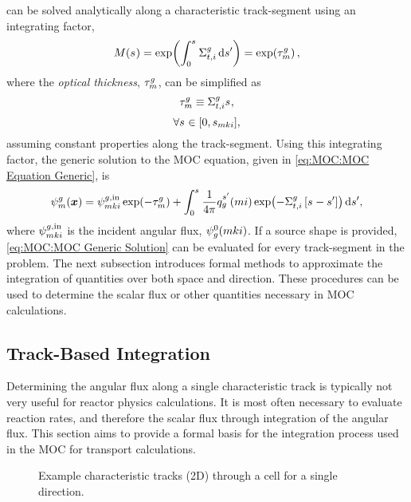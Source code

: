 {{         can be solved analytically along a characteristic track-segment using an integrating factor,
        \begin{equation}\label{eq:MOC:Integrating Factor}
            M(\len) = \exp\!\left(\intl[0][\len]\xst\dif{s'}\right) = \exp\!\left(\opt\right),
        \end{equation}
        where the \emph{optical thickness}, $\opt$, can be simplified as
        \begin{equation}\label{eq:MOC:Optical Thickness Definition}
            \opt \defined \xst\len,
        \end{equation}
        \begin{equation*}
          \forall \len \in [0,\segl],
        \end{equation*}
        assuming constant properties along the track-segment.
        Using this integrating factor, the generic solution to the \ac{MOC} equation, given in \cref{eq:MOC:MOC Equation Generic}, is
        \begin{equation}\label{eq:MOC:MOC Generic Solution}
            \aflux = \afluxin\exp\!\left(-\opt\right) + \intl[0][\len]\rfourpi\source[mi][g][\len']\exp\!\left(-\xst\left[\len-\len'\right]\right)\dif{s'},
        \end{equation}
        where $\afluxin$ is the incident angular flux, $\aflux[mki][g][0]$.
        If a source shape is provided, \cref{eq:MOC:MOC Generic Solution} can be evaluated for every track-segment in the problem.
        The next subsection introduces formal methods to approximate the integration of quantities over both space and direction.
        These procedures can be used to determine the scalar flux or other quantities necessary in \ac{MOC} calculations.

        \subsection{Track-Based Integration}{\label{ssec:MOC:Track-Based Integration}
            Determining the angular flux along a single characteristic track is typically not very useful for reactor physics calculations.
            It is most often necessary to evaluate reaction rates, and therefore the scalar flux through integration of the angular flux.
            This section aims to provide a formal basis for the integration process used in the \ac{MOC} for transport calculations.

            \begin{figure}[h]
                \centering
                \def\svgwidth{0.4\linewidth}
                
                \caption{Example characteristic tracks (2D) through a cell for a single direction.}
                \label{fig:MOC:MOC Tracks}
            \end{figure}

}}}
